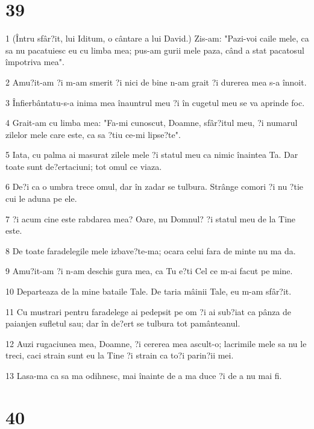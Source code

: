 \chapter{39}

\par 1 (Întru sfâr?it, lui Iditum, o cântare a lui David.) Zis-am: "Pazi-voi caile mele, ca sa nu pacatuiesc eu cu limba mea; pus-am gurii mele paza, când a stat pacatosul împotriva mea".
\par 2 Amu?it-am ?i m-am smerit ?i nici de bine n-am grait ?i durerea mea s-a înnoit.
\par 3 Înfierbântatu-s-a inima mea înauntrul meu ?i în cugetul meu se va aprinde foc.
\par 4 Grait-am cu limba mea: "Fa-mi cunoscut, Doamne, sfâr?itul meu, ?i numarul zilelor mele care este, ca sa ?tiu ce-mi lipse?te".
\par 5 Iata, cu palma ai masurat zilele mele ?i statul meu ca nimic înaintea Ta. Dar toate sunt de?ertaciuni; tot omul ce viaza.
\par 6 De?i ca o umbra trece omul, dar în zadar se tulbura. Strânge comori ?i nu ?tie cui le aduna pe ele.
\par 7 ?i acum cine este rabdarea mea? Oare, nu Domnul? ?i statul meu de la Tine este.
\par 8 De toate faradelegile mele izbave?te-ma; ocara celui fara de minte nu ma da.
\par 9 Amu?it-am ?i n-am deschis gura mea, ca Tu e?ti Cel ce m-ai facut pe mine.
\par 10 Departeaza de la mine bataile Tale. De taria mâinii Tale, eu m-am sfâr?it.
\par 11 Cu mustrari pentru faradelege ai pedepsit pe om ?i ai sub?iat ca pânza de paianjen sufletul sau; dar în de?ert se tulbura tot pamânteanul.
\par 12 Auzi rugaciunea mea, Doamne, ?i cererea mea ascult-o; lacrimile mele sa nu le treci, caci strain sunt eu la Tine ?i strain ca to?i parin?ii mei.
\par 13 Lasa-ma ca sa ma odihnesc, mai înainte de a ma duce ?i de a nu mai fi.

\chapter{40}

